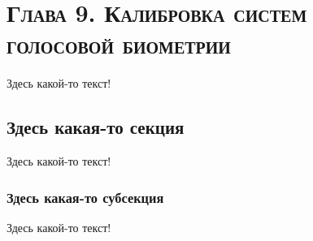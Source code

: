 \documentclass[12pt]{book}
\begin{document}
\chapter*{\textsc{Глава 9. Калибровка систем голосовой биометрии}}

\thispagestyle{fancy}

\large{Здесь какой-то текст!}

\section{Здесь какая-то секция}

\large{Здесь какой-то текст!}

\subsection{Здесь какая-то субсекция}

\large{Здесь какой-то текст!}
\end{document}
